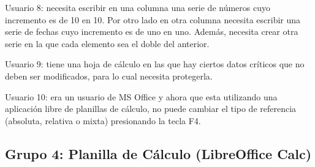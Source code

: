 \documentclass[12pt]{article}
\begin{document}
\begin{description}
    \item{Usuario 8}: necesita escribir en una columna una serie de números
    cuyo incremento es de 10 en 10. Por otro lado en otra columna necesita
    escribir una serie de fechas cuyo incremento es de uno en uno. Además,
    necesita crear otra serie en la que cada elemento sea el doble del
    anterior.

    \item{Usuario 9}: tiene una hoja de cálculo en las que hay ciertos datos
    críticos que no deben ser modificados, para lo cual necesita protegerla.

    \item{Usuario 10}: era un usuario de MS Office y ahora que esta utilizando
    una aplicación libre de planillas de cálculo, no puede cambiar el tipo de
    referencia (absoluta, relativa o mixta) presionando la tecla F4.

\end{description}

\subsection*{Grupo 4: Planilla de Cálculo (LibreOffice Calc)}
\end{document}
